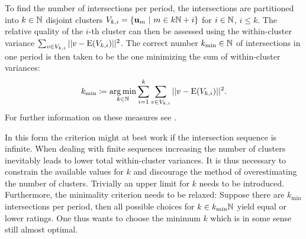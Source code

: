 To find the number of intersections per period, the intersections are partitioned into $k \in \mathbb{N}$ disjoint clusters $V_{k,i} = \{ \textbf{u}_m\ |\ m \in k\mathbb{N}+i \}$ for $i \in \mathbb{N}$, $i \le k$.
The relative quality of the $i$-th cluster can then be assessed using the within-cluster variance $\sum_{v \in V_{k,i} } ||v - \operatorname{E}(V_{k,i})||^2$.
The correct number $k_{\text{min}} \in \mathbb{N}$ of intersections in one period is then taken to be the one minimizing the sum of within-cluster variances:
\[
	k_\text{min} \coloneqq \operatorname*{arg\,min}_{k \in \mathbb{N}} \sum_{i = 1}^k \sum_{v \in V_{k,i} } ||v - \operatorname{E}(V_{k,i})||^2 \text.
\]
For further information on these measures see \cite{halkidi2001clustering}. %

In this form the criterion might at best work if the intersection sequence is infinite.
When dealing with finite sequences increasing the number of clusters inevitably leads to lower total within-cluster variances.
It is thus necessary to constrain the available values for $k$ and discourage the method of overestimating the number of clusters.
Trivially an upper limit for $k$ needs to be introduced.
Furthermore, the minimality criterion needs to be relaxed: Suppose there are $k_\text{min}$ intersections per period, then all possible choices for $k \in k_\text{min}\mathbb{N}$ yield equal or lower ratings.
One thus wants to choose the minimum $k$ which is in some sense still almost optimal.
